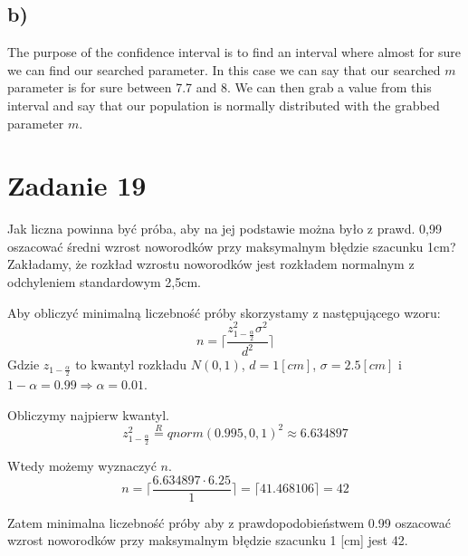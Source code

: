 \documentclass{article}
\begin{document}
\subsection{b)}
The purpose of the confidence interval is to find an interval where almost for sure we can find our searched parameter. In this case we can say that our searched $m$ parameter is for sure between 7.7 and 8. We can then grab a value from this interval and say that our population is normally distributed with the grabbed parameter $m$.

\section{Zadanie 19}
Jak liczna powinna być próba, aby na jej podstawie można było z prawd. 0,99 oszacować średni wzrost noworodków przy maksymalnym błędzie szacunku 1cm? Zakładamy, że rozkład wzrostu noworodków jest rozkładem normalnym z odchyleniem standardowym 2,5cm. \\ \par

Aby obliczyć minimalną liczebność próby skorzystamy z następującego wzoru:
\[ n = \Big\lceil \frac{z^2_{1-\frac{\alpha}{2}} \sigma^2}{d^2} \Big\rceil \]
Gdzie $z_{1-\frac{\alpha}{2}}$ to kwantyl rozkładu $N(0,1)$, $d = 1 [cm]$, $\sigma = 2.5 [cm]$ i $1 - \alpha = 0.99 \Rightarrow \alpha = 0.01$.

Obliczymy najpierw kwantyl.
\[ z^2_{1-\frac{\alpha}{2}} \overset{R}{=} qnorm(0.995, 0, 1)^2 \approx 6.634897 \]

Wtedy możemy wyznaczyć $n$.
\[ n = \Big\lceil \frac{6.634897 \cdot 6.25 }{1} \Big\rceil = \lceil 41.468106 \rceil = 42 \]

Zatem minimalna liczebność próby aby z prawdopodobieństwem 0.99 oszacować wzrost noworodków przy maksymalnym błędzie szacunku 1 [cm] jest 42.
\end{document}
